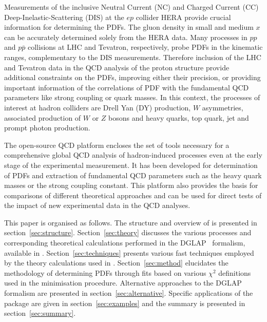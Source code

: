 Measurements of the inclusive Neutral Current (NC) and Charged Current (CC)  
Deep-Inelastic-Scattering (DIS) at the $ep$ collider HERA provide crucial information for determining the PDFs.
%
The gluon density in small and medium $x$  
can be accurately determined solely from the HERA data.
%
Many processes in $pp$ and $p \bar p$ collisions at LHC and Tevatron, respectively, 
probe PDFs in the kinematic ranges, complementary to the DIS measurements.
Therefore inclusion of the LHC and Tevatron data in the QCD analysis of the proton structure 
provide additional constraints on the PDFs, improving either their precision, 
or providing important information of the correlations of PDF with the fundamental 
QCD parameters like strong coupling or quark masses. 
%
%
In this context, the processes of interest at hadron colliders are
Drell Yan (DY) production, $W$ asymmetries, associated production of $W$ or $Z$ bosons 
and heavy quarks, top quark, jet and prompt photon production.
%

%
The open-source QCD platform \fitter encloses the set of tools  necessary for a comprehensive global 
QCD analysis of hadron-induced processes even at the early stage of the experimental measurement. 
It has been developed for determination of PDFs and extraction of fundamental QCD parameters such as the heavy
quark masses or the strong coupling constant. This platform also provides the basis for 
comparisons of different theoretical approaches and can be used for direct tests of the impact 
of new experimental data in the QCD analyses.

This paper is organised as follows.
%
The structure and overview of \fitter is presented in section~\ref{sec:structure}.
Section~\ref{sec:theory} discusses the various processes 
and corresponding theoretical calculations performed in the DGLAP~\cite{Gribov:1972ri,Gribov:1972rt,Lipatov:1974qm,
Dokshitzer:1977sg,Altarelli:1977zs} formalism, available in \fitter.
%
Section~\ref{sec:techniques} presents various fast techniques employed by the theory calculations used in \fitter.
Section~\ref{sec:method} elucidates the 
methodology of determining PDFs through fits based on various
 $\chi^2$ definitions used in the
minimisation procedure. 
Alternative approaches to the DGLAP formalism are presented in section~\ref{sec:alternative}.
%
Specific applications of the package are given in
section~\ref{sec:examples} and the summary is presented in section~\ref{sec:summary}.
%
